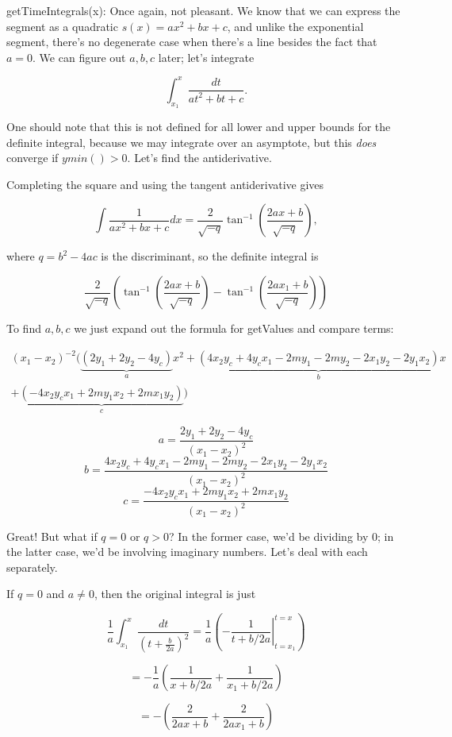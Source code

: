 \documentclass{article}
\begin{document}
{getTimeIntegrals(x): Once again, not pleasant. We know that we can express the segment as a quadratic $s(x)=ax^2+bx+c$, and unlike the exponential segment, there's no degenerate case when there's a line besides the fact that $a=0$. We can figure out $a,b,c$ later; let's integrate

$$\int_{x_1}^x \frac{dt}{at^2+bt+c}.$$

One should note that this is not defined for all lower and upper bounds for the definite integral, because we may integrate over an asymptote, but this \textit{does} converge if $ymin() > 0$. Let's find the antiderivative.

Completing the square and using the tangent antiderivative gives

$$\int \frac{1}{ax^2+bx+c}dx = \frac{2}{\sqrt{-q}}\tan^{-1}\left(\frac{2ax+b}{\sqrt{-q}}\right),$$

where $q=b^2-4ac$ is the discriminant, so the definite integral is

$$\frac{2}{\sqrt{-q}}\left(\tan^{-1}\left(\frac{2ax+b}{\sqrt{-q}}\right)-\tan^{-1}\left(\frac{2ax_1+b}{\sqrt{-q}}\right)\right)$$

To find $a,b,c$ we just expand out the formula for getValues and compare terms:

\begin{multline*}
(x_1-x_2)^{-2}(\underbrace{(2y_1+2y_2-4y_c)}_ax^2 + \underbrace{(4 x_2 y_c + 4 y_c x_1 - 2 m y_1 - 2 m y_2 - 2 x_1 y_2 - 2 y_1 x_2)}_b x \\ + \underbrace{(-4 x_2 y_c x_1 + 2 m y_1 x_2 + 2 m x_1 y_2)}_c)
\end{multline*}

$$a=\frac{2y_1+2y_2-4y_c}{(x_1-x_2)^2}$$
$$b=\frac{4 x_2 y_c + 4 y_c x_1 - 2 m y_1 - 2 m y_2 - 2 x_1 y_2 - 2 y_1 x_2}{(x_1-x_2)^2}$$
$$c=\frac{-4 x_2 y_c x_1 + 2 m y_1 x_2 + 2 m x_1 y_2}{(x_1-x_2)^2}$$

Great! But what if $q=0$ or $q> 0$? In the former case, we'd be dividing by $0$; in the latter case, we'd be involving imaginary numbers. Let's deal with each separately.

If $q=0$ and $a\neq 0$, then the original integral is just

$$\frac{1}{a}\int_{x_1}^x\frac{dt}{\left(t+\frac{b}{2a}\right)^2}=\frac{1}{a}\left(\left.-\frac{1}{t+b/2a}\right\vert_{t=x_1}^{t=x}\right)$$

$$=-\frac{1}{a}\left(\frac{1}{x+b/2a}+\frac{1}{x_1+b/2a}\right)$$

$$=-\left(\frac{2}{2ax+b}+\frac{2}{2ax_1+b}\right)$$

}
\end{document}
